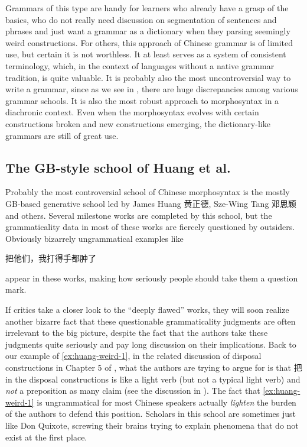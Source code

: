 Grammars of this type are handy for learners who already have a grasp of the basics, who do not really need 
discussion on segmentation of sentences and phrases and just want a grammar as a dictionary when they 
parsing seemingly weird constructions. For others, this approach of Chinese grammar is of limited use,
but certain it is not worthless. It at least serves as a system of consistent terminology, which, in 
the context of languages without a native grammar tradition, is quite valuable. It is probably also 
the most uncontroversial way to write a grammar, since as we see in ,
there are huge discrepancies among various grammar schools. It is also the most robust approach to 
morphosyntax in a diachronic context. Even when the morphosyntax evolves with certain constructions broken 
and new constructions emerging, the dictionary-like grammars are still of great use. 

\subsection{The GB-style school of Huang et al.}\label{sec:gb-grammar}

Probably the most controversial school of Chinese morphosyntax is the mostly GB-based generative school led by James Huang 黄正德, 
Sze-Wing Tang 邓思颖 and others. Several milestone works are completed by this school, but the grammaticality 
data in most of these works are fiercely questioned by outsiders. Obviously bizarrely ungrammatical examples 
like \citep[sec. 5.4.2, (65)]{huang2013} 
\begin{exe}
    \ex\label{ex:huang-weird-1} 把他们，我打得手都肿了
\end{exe}
appear in these works, making how seriously people should take them a question mark.

If critics take a closer look to the ``deeply flawed'' works, they will soon realize another bizarre fact that 
these questionable grammaticality judgments are often irrelevant to the big picture, despite the fact that 
the authors take these judgments quite seriously and pay long discussion on their implications.
Back to our example of \eqref{ex:huang-weird-1}, in the related discussion of disposal constructions in 
Chapter 5 of \citet{huang2013}, what the authors are trying to argue for is that 把 in the disposal constructions 
is like a light verb (but not a typical light verb) and \emph{not} a preposition as many claim 
(see the discussion in ). The fact that \eqref{ex:huang-weird-1} is ungrammatical 
for most Chinese speakers actually \emph{lighten} the burden of the authors to defend this position.
Scholars in this school are sometimes just like Don Quixote, screwing their brains trying to explain
phenomena that do not exist at the first place.

